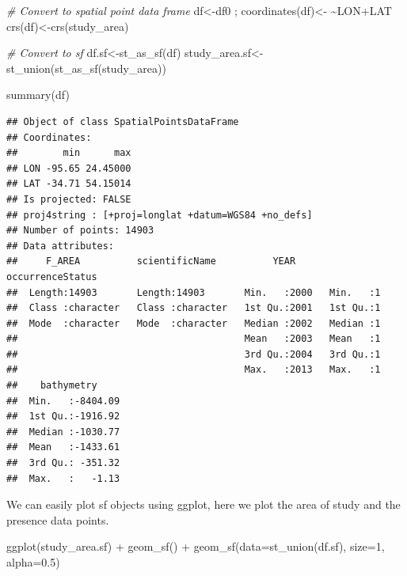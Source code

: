 \documentclass[
]{book}
\newenvironment{Shaded}{\begin{snugshade}}{\end{snugshade}}
\newcommand{\AttributeTok}[1]{\textcolor[rgb]{0.77,0.63,0.00}{#1}}
\newcommand{\CommentTok}[1]{\textcolor[rgb]{0.56,0.35,0.01}{\textit{#1}}}
\newcommand{\DecValTok}[1]{\textcolor[rgb]{0.00,0.00,0.81}{#1}}
\newcommand{\ErrorTok}[1]{\textcolor[rgb]{0.64,0.00,0.00}{\textbf{#1}}}
\newcommand{\FloatTok}[1]{\textcolor[rgb]{0.00,0.00,0.81}{#1}}
\newcommand{\FunctionTok}[1]{\textcolor[rgb]{0.00,0.00,0.00}{#1}}
\newcommand{\NormalTok}[1]{#1}
\newcommand{\OtherTok}[1]{\textcolor[rgb]{0.56,0.35,0.01}{#1}}
\newcommand{\SpecialCharTok}[1]{\textcolor[rgb]{0.00,0.00,0.00}{#1}}
\begin{document}
\begin{Shaded}
\begin{Highlighting}[]
\CommentTok{\# Convert to spatial point data frame}
\NormalTok{df}\OtherTok{\textless{}{-}}\NormalTok{df0 ; }\FunctionTok{coordinates}\NormalTok{(df)}\OtherTok{\textless{}{-}} \ErrorTok{\textasciitilde{}}\NormalTok{LON}\SpecialCharTok{+}\NormalTok{LAT}
\FunctionTok{crs}\NormalTok{(df)}\OtherTok{\textless{}{-}}\FunctionTok{crs}\NormalTok{(study\_area)}

\CommentTok{\# Convert to sf}
\NormalTok{df.sf}\OtherTok{\textless{}{-}}\FunctionTok{st\_as\_sf}\NormalTok{(df)}
\NormalTok{study\_area.sf}\OtherTok{\textless{}{-}}\FunctionTok{st\_union}\NormalTok{(}\FunctionTok{st\_as\_sf}\NormalTok{(study\_area))}


\FunctionTok{summary}\NormalTok{(df)}
\end{Highlighting}
\end{Shaded}

\begin{verbatim}
## Object of class SpatialPointsDataFrame
## Coordinates:
##        min      max
## LON -95.65 24.45000
## LAT -34.71 54.15014
## Is projected: FALSE 
## proj4string : [+proj=longlat +datum=WGS84 +no_defs]
## Number of points: 14903
## Data attributes:
##     F_AREA          scientificName          YEAR      occurrenceStatus
##  Length:14903       Length:14903       Min.   :2000   Min.   :1       
##  Class :character   Class :character   1st Qu.:2001   1st Qu.:1       
##  Mode  :character   Mode  :character   Median :2002   Median :1       
##                                        Mean   :2003   Mean   :1       
##                                        3rd Qu.:2004   3rd Qu.:1       
##                                        Max.   :2013   Max.   :1       
##    bathymetry      
##  Min.   :-8404.09  
##  1st Qu.:-1916.92  
##  Median :-1030.77  
##  Mean   :-1433.61  
##  3rd Qu.: -351.32  
##  Max.   :   -1.13
\end{verbatim}

We can easily plot sf objects using ggplot, here we plot the area of study and the presence data points.

\begin{Shaded}
\begin{Highlighting}[]
\FunctionTok{ggplot}\NormalTok{(study\_area.sf) }\SpecialCharTok{+} 
  \FunctionTok{geom\_sf}\NormalTok{() }\SpecialCharTok{+} 
  \FunctionTok{geom\_sf}\NormalTok{(}\AttributeTok{data=}\FunctionTok{st\_union}\NormalTok{(df.sf),}
          \AttributeTok{size=}\DecValTok{1}\NormalTok{,}
          \AttributeTok{alpha=}\FloatTok{0.5}\NormalTok{)}
\end{Highlighting}
\end{Shaded}
\end{document}
